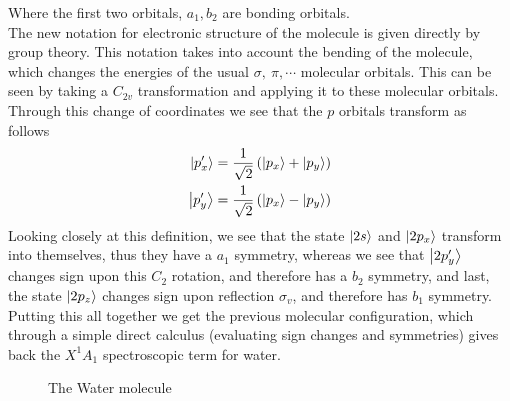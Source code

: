 \documentclass[../qm.tex]{subfiles}
\begin{document}
	Where the first two orbitals, $a_1,b_2$ are bonding orbitals.\\
	The new notation for electronic structure of the molecule is given directly by group theory. This notation takes into account the bending of the molecule, which changes the energies of the usual $\sigma,\ \pi,\cdots$ molecular orbitals. This can be seen by taking a $C_{2v}$ transformation and applying it to these molecular orbitals. Through this change of coordinates we see that the $p$ orbitals transform as follows
	\begin{equation}
		\begin{aligned}
			\ket{p_x'}&=\frac{1}{\sqrt{2}}\left( \ket{p_x}+\ket{p_y} \right)\\
			\ket{p_y'}&=\frac{1}{\sqrt{2}}\left( \ket{p_x}-\ket{p_y} \right)
		\end{aligned}
		\label{eq:c2vh2otransformation}
	\end{equation}
	Looking closely at this definition, we see that the state $\ket{2s}$ and $\ket{2p_x}$ transform into themselves, thus they have a $a_1$ symmetry, whereas we see that $\ket{2p_y'}$ changes sign upon this $C_{2}$ rotation, and therefore has a $b_2$ symmetry, and last, the state $\ket{2p_z}$ changes sign upon reflection $\sigma_v$, and therefore has $b_1$ symmetry.\\
	Putting this all together we get the previous molecular configuration, which through a simple direct calculus (evaluating sign changes and symmetries) gives back the $X^1A_1$ spectroscopic term for water.
	\begin{figure}[H]
		\centering
		\caption{The Water molecule}
		\label{fig:h20}
	\end{figure}
\end{document}
